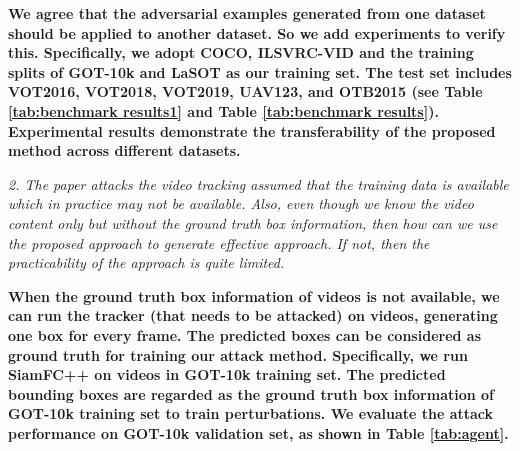 \documentclass[12pt]{article}
\begin{document}
\textbf{
We agree that the adversarial examples generated from one dataset should be applied to another dataset. So we add experiments to verify this. Specifically, we adopt COCO, ILSVRC-VID and the training splits of GOT-10k and LaSOT as our training set. The test set includes VOT2016, VOT2018, VOT2019, UAV123, and OTB2015 (see Table \ref{tab:benchmark results1} and Table \ref{tab:benchmark results}).
Experimental results demonstrate the transferability of the proposed method across different datasets.}

\textit{2. The paper attacks the video tracking assumed that the training data is available which in practice may not be available. Also, even though we know the video content only but without the ground truth box information, then how can we use the proposed approach to generate effective approach. If not, then the practicability of the approach is quite limited.}


\textbf{
When the ground truth box information of videos is not available, we can run the tracker (that needs to be attacked) on videos, generating one box for every frame. The predicted boxes can be considered as ground truth for training our attack method.
Specifically, we run SiamFC++ on videos in GOT-10k training set. The predicted bounding boxes are regarded as the ground truth box information of GOT-10k training set to train perturbations. We evaluate the attack performance on GOT-10k validation set, as shown in Table \ref{tab:agent}.}
\end{document}
